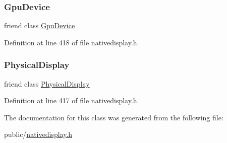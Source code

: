 \subsubsection{\texorpdfstring{Gpu\+Device}{GpuDevice}}
{\footnotesize\ttfamily friend class \mbox{\hyperlink{classhwcomposer_1_1GpuDevice}{Gpu\+Device}}\hspace{0.3cm}{\ttfamily [friend]}}



Definition at line 418 of file nativedisplay.\+h.

\mbox{\label{classhwcomposer_1_1NativeDisplay_a3e381d9464ef96b091fe38d2919fda4a}} 
\subsubsection{\texorpdfstring{Physical\+Display}{PhysicalDisplay}}
{\footnotesize\ttfamily friend class \mbox{\hyperlink{classhwcomposer_1_1PhysicalDisplay}{Physical\+Display}}\hspace{0.3cm}{\ttfamily [friend]}}



Definition at line 417 of file nativedisplay.\+h.



The documentation for this class was generated from the following file\+:\begin{DoxyCompactItemize}
\item 
public/\mbox{\hyperlink{nativedisplay_8h}{nativedisplay.\+h}}\end{DoxyCompactItemize}
